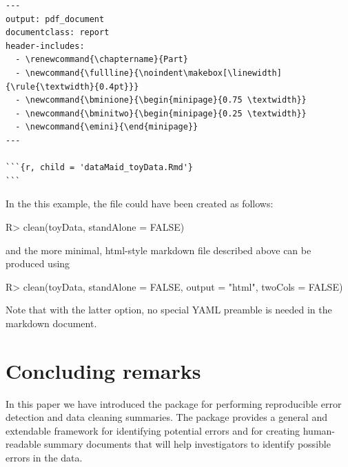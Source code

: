 \documentclass[article,shortnames]{jss}
\newcommand{\hl}[1]{\textcolor{magenta}{#1}}
\begin{document}
{\small
\begin{Verbatim}
---
output: pdf_document
documentclass: report
header-includes:
  - \renewcommand{\chaptername}{Part}
  - \newcommand{\fullline}{\noindent\makebox[\linewidth]{\rule{\textwidth}{0.4pt}}}
  - \newcommand{\bminione}{\begin{minipage}{0.75 \textwidth}}
  - \newcommand{\bminitwo}{\begin{minipage}{0.25 \textwidth}}
  - \newcommand{\emini}{\end{minipage}}
---

```{r, child = 'dataMaid_toyData.Rmd'}
```
\end{Verbatim}
}

In the this example, the  file could have
been created as follows:

\begin{Schunk}
\begin{Sinput}
R> clean(toyData, standAlone = FALSE)
\end{Sinput}
\end{Schunk}

and the more minimal, html-style  markdown file described above can be produced using

\begin{Schunk}
\begin{Sinput}
R> clean(toyData, standAlone = FALSE, output = "html", twoCols = FALSE)
\end{Sinput}
\end{Schunk}

Note that with the latter option, no special YAML preamble is needed in the  markdown document.



\section{Concluding remarks}
\label{conclusion}

In this paper we have introduced the  package 
for performing reproducible error detection and data cleaning
summaries. The package provides a general and extendable framework for
identifying potential errors and for creating human-readable summary
documents that will help investigators to identify possible errors in
the data.
\end{document}
